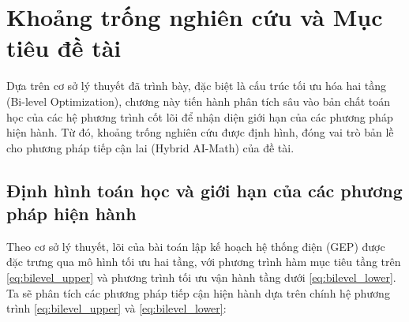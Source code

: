 \chapter{Khoảng trống nghiên cứu và Mục tiêu đề tài}
\label{chap:research_gap}

Dựa trên cơ sở lý thuyết đã trình bày, đặc biệt là cấu trúc tối ưu hóa hai tầng (Bi-level Optimization), chương này tiến hành phân tích sâu vào bản chất toán học của các hệ phương trình cốt lõi để nhận diện giới hạn của các phương pháp hiện hành. Từ đó, khoảng trống nghiên cứu được định hình, đóng vai trò bản lề cho phương pháp tiếp cận lai (Hybrid AI-Math) của đề tài.

\section{Định hình toán học và giới hạn của các phương pháp hiện hành}

Theo cơ sở lý thuyết, lõi của bài toán lập kế hoạch hệ thống điện (GEP) được đặc trưng qua mô hình tối ưu hai tầng, với phương trình hàm mục tiêu tầng trên \eqref{eq:bilevel_upper} và phương trình tối ưu vận hành tầng dưới \eqref{eq:bilevel_lower}. Ta sẽ phân tích các phương pháp tiếp cận hiện hành dựa trên chính hệ phương trình \eqref{eq:bilevel_upper} và \eqref{eq:bilevel_lower}:

